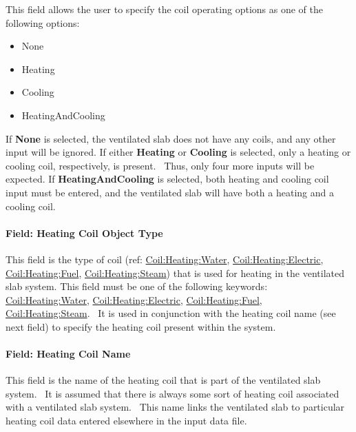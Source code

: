 This field allows the user to specify the coil operating options as one of the following options:

\begin{itemize}
\item
  None
\item
  Heating
\item
  Cooling
\item
  HeatingAndCooling
\end{itemize}

If \textbf{None} is selected, the ventilated slab does not have any coils, and any other input will be ignored. If either \textbf{Heating} or \textbf{Cooling} is selected, only a heating or cooling coil, respectively, is present.~ Thus, only four more inputs will be expected. If \textbf{HeatingAndCooling} is selected, both heating and cooling coil input must be entered, and the ventilated slab will have both a heating and a cooling coil.

\paragraph{Field: Heating Coil Object Type}\label{field-heating-coil-object-type-001}

This field is the type of coil (ref: \hyperref[coilheatingwater]{Coil:Heating:Water}, \hyperref[coilheatingelectric]{Coil:Heating:Electric}, \hyperref[coilheatinggas-000]{Coil:Heating:Fuel}, \hyperref[coilheatingsteam]{Coil:Heating:Steam}) that is used for heating in the ventilated slab system. This field must be one of the following keywords: \hyperref[coilheatingwater]{Coil:Heating:Water}, \hyperref[coilheatingelectric]{Coil:Heating:Electric}, \hyperref[coilheatinggas-000]{Coil:Heating:Fuel}, \hyperref[coilheatingsteam]{Coil:Heating:Steam}.~ It is used in conjunction with the heating coil name (see next field) to specify the heating coil present within the system.

\paragraph{Field: Heating Coil Name}\label{field-heating-coil-name-001}

This field is the name of the heating coil that is part of the ventilated slab system.~ It is assumed that there is always some sort of heating coil associated with a ventilated slab system.~ This name links the ventilated slab to particular heating coil data entered elsewhere in the input data file.

